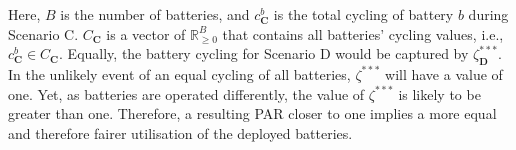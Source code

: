 Here, $B$ is the number of batteries, and $c_\textbf{C}^b$ is the total cycling of battery $b$ during Scenario {C}. $C_\textbf{C}$ is a vector of $\mathbb{R}_{\geq 0}^{B}$ that contains all batteries' cycling values, i.e., $c_\textbf{C}^b \in C_\textbf{C}$. Equally, the battery cycling for Scenario {D} would be captured by $\zeta_\textbf{D}^{***}$. In the unlikely event of an equal cycling of all batteries, $\zeta^{***}$ will have a value of one. Yet, as batteries are operated differently, the value of $\zeta^{***}$ is likely to be greater than one. Therefore, a resulting PAR closer to one implies a more equal and therefore fairer utilisation of the deployed batteries.